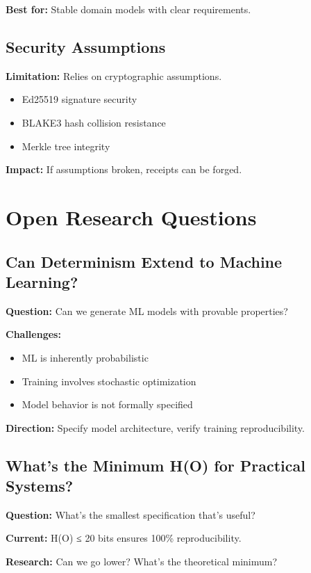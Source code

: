 \textbf{Best for:} Stable domain models with clear requirements.

\subsection{Security Assumptions}

\textbf{Limitation:} Relies on cryptographic assumptions.

\begin{itemize}
    \item Ed25519 signature security
    \item BLAKE3 hash collision resistance
    \item Merkle tree integrity
\end{itemize}

\textbf{Impact:} If assumptions broken, receipts can be forged.

\section{Open Research Questions}

\subsection{Can Determinism Extend to Machine Learning?}

\textbf{Question:} Can we generate ML models with provable properties?

\textbf{Challenges:}
\begin{itemize}
    \item ML is inherently probabilistic
    \item Training involves stochastic optimization
    \item Model behavior is not formally specified
\end{itemize}

\textbf{Direction:} Specify model architecture, verify training reproducibility.

\subsection{What's the Minimum H(O) for Practical Systems?}

\textbf{Question:} What's the smallest specification that's useful?

\textbf{Current:} H(O) ≤ 20 bits ensures 100\% reproducibility.

\textbf{Research:} Can we go lower? What's the theoretical minimum?

